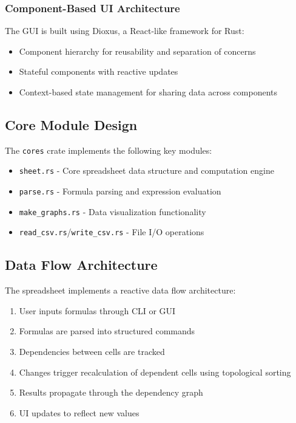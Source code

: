 \documentclass[12pt]{article}
\begin{document}
\subsubsection{Component-Based UI Architecture}
The GUI is built using Dioxus, a React-like framework for Rust:
\begin{itemize}
    \item Component hierarchy for reusability and separation of concerns
    \item Stateful components with reactive updates
    \item Context-based state management for sharing data across components
\end{itemize}

\subsection{Core Module Design}
The \texttt{cores} crate implements the following key modules:
\begin{itemize}
    \item \texttt{sheet.rs} - Core spreadsheet data structure and computation engine
    \item \texttt{parse.rs} - Formula parsing and expression evaluation
    \item \texttt{make\_graphs.rs} - Data visualization functionality
    \item \texttt{read\_csv.rs}/\texttt{write\_csv.rs} - File I/O operations
\end{itemize}

\subsection{Data Flow Architecture}
The spreadsheet implements a reactive data flow architecture:
\begin{enumerate}
    \item User inputs formulas through CLI or GUI
    \item Formulas are parsed into structured commands
    \item Dependencies between cells are tracked
    \item Changes trigger recalculation of dependent cells using topological sorting
    \item Results propagate through the dependency graph
    \item UI updates to reflect new values
\end{enumerate}
\end{document}
